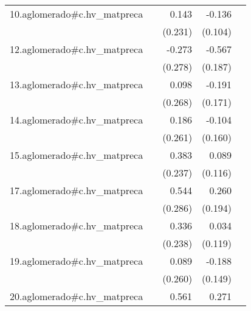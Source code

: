 {\begin{longtable}{l*{4}{D{.}{.}{-1}}}
\addlinespace
10.aglomerado#c.hv\_matpreca&                     &       0.143         &      -0.136         &                     \\
            &                     &     (0.231)         &     (0.104)         &                     \\
\addlinespace
12.aglomerado#c.hv\_matpreca&                     &      -0.273         &      -0.567\sym{**} &                     \\
            &                     &     (0.278)         &     (0.187)         &                     \\
\addlinespace
13.aglomerado#c.hv\_matpreca&                     &       0.098         &      -0.191         &                     \\
            &                     &     (0.268)         &     (0.171)         &                     \\
\addlinespace
14.aglomerado#c.hv\_matpreca&                     &       0.186         &      -0.104         &                     \\
            &                     &     (0.261)         &     (0.160)         &                     \\
\addlinespace
15.aglomerado#c.hv\_matpreca&                     &       0.383         &       0.089         &                     \\
            &                     &     (0.237)         &     (0.116)         &                     \\
\addlinespace
17.aglomerado#c.hv\_matpreca&                     &       0.544         &       0.260         &                     \\
            &                     &     (0.286)         &     (0.194)         &                     \\
\addlinespace
18.aglomerado#c.hv\_matpreca&                     &       0.336         &       0.034         &                     \\
            &                     &     (0.238)         &     (0.119)         &                     \\
\addlinespace
19.aglomerado#c.hv\_matpreca&                     &       0.089         &      -0.188         &                     \\
            &                     &     (0.260)         &     (0.149)         &                     \\
\addlinespace
20.aglomerado#c.hv\_matpreca&                     &       0.561         &       0.271         &                     \\

\end{longtable}}
